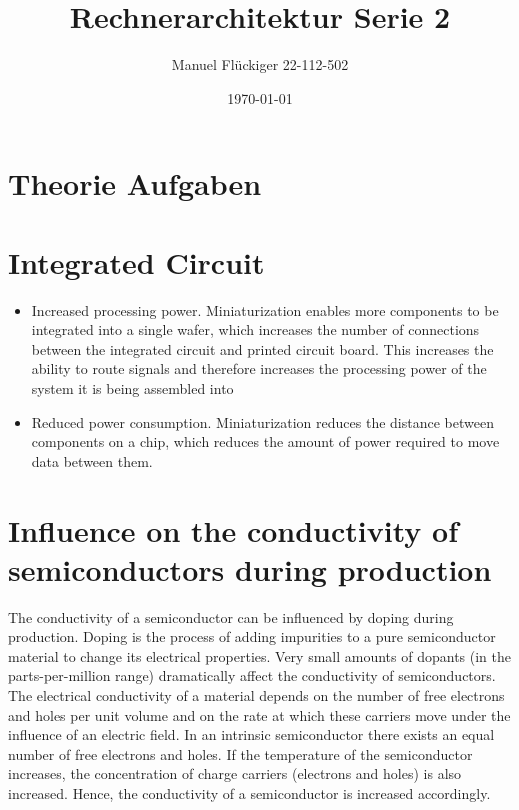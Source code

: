 \documentclass{article}
\author{Manuel Flückiger 22-112-502}
\title{Rechnerarchitektur Serie 2}
\date{\today}
\begin{document}
\newcommand{\mycomment}[1]{}

\maketitle

\section*{Theorie Aufgaben}
\section{Integrated Circuit}
\begin{itemize}
    \item Increased processing power. \newline
    Miniaturization enables more components to be integrated into a 
    single wafer, which increases the number of connections between 
    the integrated circuit and printed circuit board. This increases 
    the ability to route signals and therefore increases the processing 
    power of the system it is being assembled into

    \item Reduced power consumption. \newline
    Miniaturization reduces the distance between components on a chip, 
    which reduces the amount of power required to move data between them.
\end{itemize}

\section{Influence on the conductivity of semiconductors during production}

The conductivity of a semiconductor can be influenced by doping during production. 
Doping is the process of adding impurities to a pure semiconductor material to change
its electrical properties. Very small amounts of dopants (in the parts-per-million range)
dramatically affect the conductivity of semiconductors. The electrical conductivity
of a material depends on the number of free electrons and holes per unit volume and 
on the rate at which these carriers move under the influence of
an electric field. In an intrinsic semiconductor there exists an equal number of 
free electrons and holes. If the temperature of the semiconductor increases, the 
concentration of charge carriers (electrons and holes) is also increased. Hence, 
the conductivity of a semiconductor is increased accordingly. 
\end{document}
